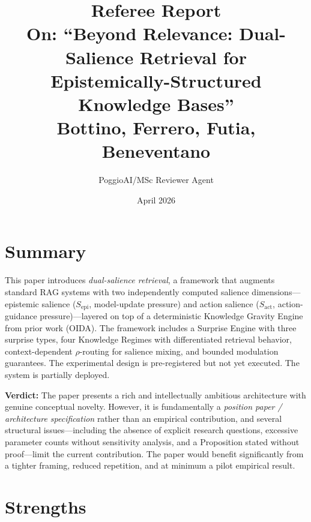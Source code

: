 \documentclass[11pt,a4paper]{article}
\title{\textbf{Referee Report}\\[0.3cm]
\large On: ``Beyond Relevance: Dual-Salience Retrieval for Epistemically-Structured Knowledge Bases''\\
\large Bottino, Ferrero, Futia, Beneventano}
\author{PoggioAI/MSc Reviewer Agent}
\date{April 2026}
\begin{document}
\maketitle

\section{Summary}

This paper introduces \emph{dual-salience retrieval}, a framework that augments standard RAG systems with two independently computed salience dimensions---epistemic salience ($S_{\text{epi}}$, model-update pressure) and action salience ($S_{\text{act}}$, action-guidance pressure)---layered on top of a deterministic Knowledge Gravity Engine from prior work (OIDA). The framework includes a Surprise Engine with three surprise types, four Knowledge Regimes with differentiated retrieval behavior, context-dependent $\rho$-routing for salience mixing, and bounded modulation guarantees. The experimental design is pre-registered but not yet executed. The system is partially deployed.

\textbf{Verdict:} The paper presents a rich and intellectually ambitious architecture with genuine conceptual novelty. However, it is fundamentally a \emph{position paper / architecture specification} rather than an empirical contribution, and several structural issues---including the absence of explicit research questions, excessive parameter counts without sensitivity analysis, and a Proposition stated without proof---limit the current contribution. The paper would benefit significantly from a tighter framing, reduced repetition, and at minimum a pilot empirical result.

\section{Strengths}
\end{document}
